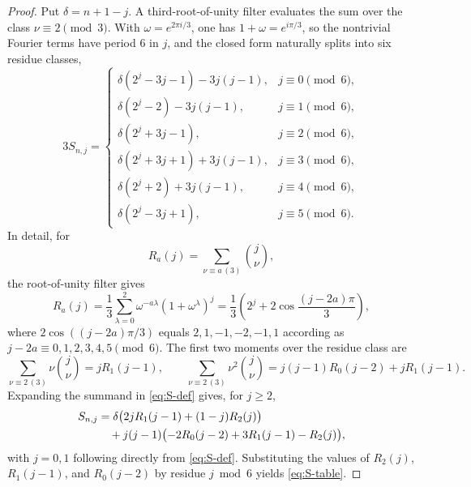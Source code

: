 \documentclass[11pt,a4paper]{amsart}
\numberwithin{equation}{section}
\theoremstyle{plain}
\theoremstyle{definition}
\begin{document}
\begin{proof}
Put \(\delta=n+1-j\).  A third-root-of-unity filter evaluates the sum over the
class \(\nu\equiv2\pmod3\).  With \(\omega=e^{2\pi i/3}\), one has
\(1+\omega=e^{i\pi/3}\), so the nontrivial Fourier terms have period \(6\) in
\(j\), and the closed form naturally splits into six residue classes,
\begin{equation}\label{eq:S-table}
3S_{n,j}=
\begin{cases}
 \delta(2^j-3j-1)-3j(j-1),&j\equiv0\pmod6,\\
 \delta(2^j-2)-3j(j-1),&j\equiv1\pmod6,\\
 \delta(2^j+3j-1),&j\equiv2\pmod6,\\
 \delta(2^j+3j+1)+3j(j-1),&j\equiv3\pmod6,\\
 \delta(2^j+2)+3j(j-1),&j\equiv4\pmod6,\\
 \delta(2^j-3j+1),&j\equiv5\pmod6.
\end{cases}
\end{equation}
In detail, for
\[
 R_a(j)=\sum_{\nu\equiv a\, (3)}\binom{j}{\nu},
\]
the root-of-unity filter gives
\[
 R_a(j)=\frac13\sum_{\lambda=0}^2\omega^{-a\lambda}(1+\omega^\lambda)^j
 =\frac13\left(2^j+2\cos\frac{(j-2a)\pi}{3}\right),
\]
where \(2\cos((j-2a)\pi/3)\) equals \(2,1,-1,-2,-1,1\) according as
\(j-2a\equiv0,1,2,3,4,5\pmod6\).  The first two moments over the residue class are
\[
 \sum_{\nu\equiv2\, (3)}\nu\binom{j}{\nu}=jR_1(j-1),
 \qquad
 \sum_{\nu\equiv2\, (3)}\nu^2\binom{j}{\nu}
 =j(j-1)R_0(j-2)+jR_1(j-1).
\]
Expanding the summand in \eqref{eq:S-def} gives, for
\(j\ge2\),
\begin{align}
 S_{n,j}
 &=\delta\bigl(2jR_1(j-1)+(1-j)R_2(j)\bigr)\notag\\
 &\quad+j(j-1)\bigl(-2R_0(j-2)+3R_1(j-1)-R_2(j)\bigr),
 \label{eq:S-R}
\end{align}
with \(j=0,1\) following directly from \eqref{eq:S-def}.  Substituting the values
of \(R_2(j)\), \(R_1(j-1)\), and \(R_0(j-2)\) by residue \(j\bmod6\) yields
\eqref{eq:S-table}.


\end{proof}
\end{document}
